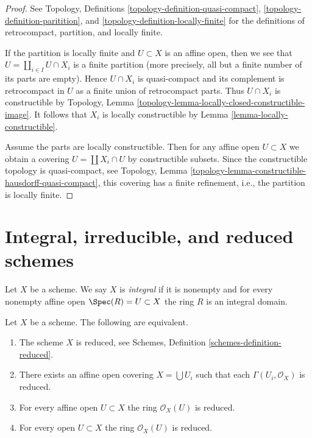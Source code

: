\begin{proof}
See Topology, Definitions
\ref{topology-definition-quasi-compact},
\ref{topology-definition-paritition}, and
\ref{topology-definition-locally-finite}
for the definitions of retrocompact, partition, and locally finite.

\medskip\noindent
If the partition is locally finite and $U \subset X$ is an
affine open, then we see that $U = \coprod_{i \in I} U \cap X_i$
is a finite partition (more precisely, all but a finite number
of its parts are empty). Hence $U \cap X_i$ is quasi-compact
and its complement is retrocompact in $U$ as a finite union
of retrocompact parts. Thus $U \cap X_i$ is constructible
by Topology, Lemma \ref{topology-lemma-locally-closed-constructible-image}.
It follows that $X_i$ is locally constructible by
Lemma \ref{lemma-locally-constructible}.

\medskip\noindent
Assume the parts are locally constructible. Then for any affine
open $U \subset X$ we obtain a covering $U = \coprod X_i \cap U$
by constructible subsets. Since the constructible topology is
quasi-compact, see
Topology, Lemma \ref{topology-lemma-constructible-hausdorff-quasi-compact},
this covering has a finite refinement, i.e.,
the partition is locally finite.
\end{proof}




\section{Integral, irreducible, and reduced schemes}
\label{section-integral}

\begin{definition}
\label{definition-integral}
Let $X$ be a scheme. We say $X$ is {\it integral} if it is nonempty and
for every nonempty affine open $\Spec(R) = U \subset X$ the ring $R$
is an integral domain.
\end{definition}

\begin{lemma}
\label{lemma-characterize-reduced}
Let $X$ be a scheme.
The following are equivalent.
\begin{enumerate}
\item The scheme $X$ is reduced, see
Schemes, Definition \ref{schemes-definition-reduced}.
\item There exists an affine open covering $X = \bigcup U_i$
such that each $\Gamma(U_i, \mathcal{O}_X)$ is reduced.
\item For every affine open $U \subset X$ the ring
$\mathcal{O}_X(U)$ is reduced.
\item For every open $U \subset X$ the ring $\mathcal{O}_X(U)$ is reduced.
\end{enumerate}
\end{lemma}

